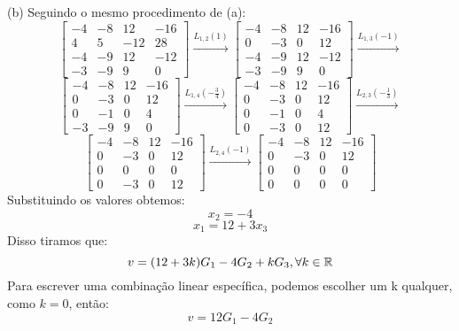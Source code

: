 \documentclass{homework}
\begin{document}
(b) Seguindo o mesmo procedimento de (a):
\[
\left[ \begin{array}{ccc|c}
    -4 & -8 & 12 & -16\\
    4 & 5 & -12 & 28\\
    -4 & -9 & 12 & -12\\
    -3 & -9 & 9 & 0
\end{array} \right] \xrightarrow{L_{1,2}(1)}
\left[ \begin{array}{ccc|c}
    -4 & -8 & 12 & -16\\
    0 & -3 & 0 & 12\\
    -4 & -9 & 12 & -12\\
    -3 & -9 & 9 & 0
\end{array} \right] \xrightarrow{L_{1,3}(-1)}
\]
\[
\left[ \begin{array}{ccc|c}
    -4 & -8 & 12 & -16\\
    0 & -3 & 0 & 12\\
    0 & -1 & 0 & 4\\
    -3 & -9 & 9 & 0
\end{array} \right] \xrightarrow{L_{1,4}(-\frac{3}{4})}
\left[ \begin{array}{ccc|c}
    -4 & -8 & 12 & -16\\
    0 & -3 & 0 & 12\\
    0 & -1 & 0 & 4\\
    0 & -3 & 0 & 12
\end{array} \right] \xrightarrow{L_{2,3}(-\frac{1}{3})}
\]
\[
\left[ \begin{array}{ccc|c}
    -4 & -8 & 12 & -16\\
    0 & -3 & 0 & 12\\
    0 & 0 & 0 & 0\\
    0 & -3 & 0 & 12
\end{array} \right] \xrightarrow{L_{2,4}(-1)}
\left[ \begin{array}{ccc|c}
    -4 & -8 & 12 & -16\\
    0 & -3 & 0 & 12\\
    0 & 0 & 0 & 0\\
    0 & 0 & 0 & 0
\end{array} \right]
\]
Substituindo os valores obtemos:
\[x_2 = -4\]
\[x_1 = 12 +3x_3\]
Disso tiramos que:
\[v = (12+3k)G_1 - 4G_2 + kG_3, \forall k \in \mathbb R\]
Para escrever uma combinação linear específica, podemos escolher um k qualquer, como $k=0$, então:
\[v = 12G_1 - 4G_2\]
\end{document}

